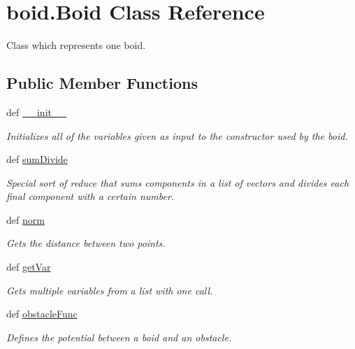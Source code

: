 \hypertarget{classboid_1_1Boid}{\section{boid.\-Boid Class Reference}
\label{classboid_1_1Boid}
}


Class which represents one boid.  


\subsection*{Public Member Functions}
\begin{DoxyCompactItemize}
\item 
def \hyperlink{classboid_1_1Boid_adc09d58160fc982be36e29effa580536}{\-\_\-\-\_\-init\-\_\-\-\_\-}
\begin{DoxyCompactList}\small\item\em Initializes all of the variables given as input to the constructor used by the boid. \end{DoxyCompactList}\item 
def \hyperlink{classboid_1_1Boid_a9223cd4c67780cbdbe60a4efb2ee441e}{sum\-Divide}
\begin{DoxyCompactList}\small\item\em Special sort of reduce that sums components in a list of vectors and divides each final component with a certain number. \end{DoxyCompactList}\item 
def \hyperlink{classboid_1_1Boid_a576c57d100aa5743d610de30bf1a2b2c}{norm}
\begin{DoxyCompactList}\small\item\em Gets the distance between two points. \end{DoxyCompactList}\item 
def \hyperlink{classboid_1_1Boid_ab232028bea08b512bbdaab5be7dfd08f}{get\-Var}
\begin{DoxyCompactList}\small\item\em Gets multiple variables from a list with one call. \end{DoxyCompactList}\item 
def \hyperlink{classboid_1_1Boid_ab330aef12ad0a338a51a7661c736e971}{obstacle\-Func}
\begin{DoxyCompactList}\small\item\em Defines the potential between a boid and an obstacle. \end{DoxyCompactList}\item 

\end{DoxyCompactItemize}
